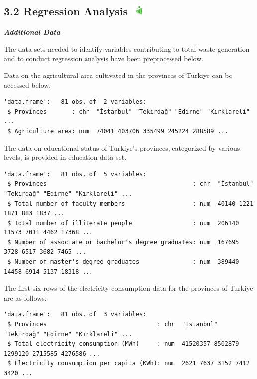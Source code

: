 \documentclass[
  11pt,
  a4paper,
  DIV=11,
  numbers=noendperiod]{scrartcl}
\begin{document}
\subsection[{3.2 Regression Analysis} ]{\texorpdfstring{{3.2 Regression
Analysis}
\protect\includegraphics[width=0.27083in,height=0.23958in]{assets/images/tredn.jpg}}{3.2 Regression Analysis }}\label{regression-analysis}

\textbf{\emph{Additional Data}}

The data sets needed to identify variables contributing to total waste
generation and to conduct regression analysis have been preprocessed
below.

Data on the {agricultural area} cultivated in the provinces of Turkiye
can be accessed below.

\begin{verbatim}
'data.frame':   81 obs. of  2 variables:
 $ Provinces       : chr  "İstanbul" "Tekirdağ" "Edirne" "Kırklareli" ...
 $ Agriculture area: num  74041 403706 335499 245224 288589 ...
\end{verbatim}

The data on {educational status} of Turkiye's provinces, categorized by
various levels, is provided in education data set.

\begin{verbatim}
'data.frame':   81 obs. of  5 variables:
 $ Provinces                                         : chr  "İstanbul" "Tekirdağ" "Edirne" "Kırklareli" ...
 $ Total number of faculty members                   : num  40140 1221 1871 883 1837 ...
 $ Total number of illiterate people                 : num  206140 11573 7011 4462 17368 ...
 $ Number of associate or bachelor's degree graduates: num  167695 3728 6517 3682 7465 ...
 $ Number of master's degree graduates               : num  389440 14458 6914 5137 18318 ...
\end{verbatim}

The first six rows of the {electricity consumption} data for the
provinces of Turkiye are as follows.

\begin{verbatim}
'data.frame':   81 obs. of  3 variables:
 $ Provinces                               : chr  "İstanbul" "Tekirdağ" "Edirne" "Kırklareli" ...
 $ Total electricity consumption (MWh)     : num  41520357 8502879 1299120 2715585 4276586 ...
 $ Electricity consumption per capita (KWh): num  2621 7637 3152 7412 3420 ...
\end{verbatim}
\end{document}
